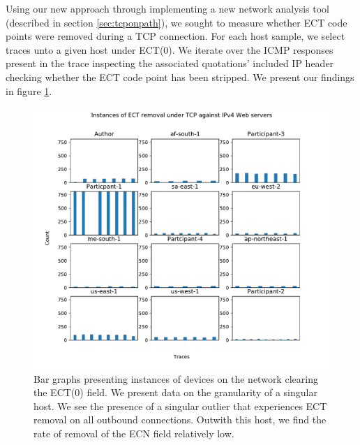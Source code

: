 \documentclass{l4proj}
\begin{document}
Using our new approach through implementing a new network analysis tool (described in section \ref{sec:tcponpath}), we sought to measure whether ECT code points were removed during a TCP connection. For each host sample, we select traces unto a given host under ECT(0). We iterate over the ICMP responses present in the trace inspecting the associated quotations' included IP header checking whether the ECT code point has been stripped. We present our findings in figure \ref{fig:ect_strip}.

\begin{figure}[H]
    \centering
    \includegraphics[scale=0.7]{dissertation/images/tcp_bar.pdf}
    \caption{Bar graphs presenting instances of devices on the network clearing the ECT(0) field. We present data on the granularity of a singular host. We see the presence of a singular outlier that experiences ECT removal on all outbound connections. Outwith this host, we find the rate of removal of the ECN field relatively low.}
    \label{fig:ect_strip}
\end{figure}
\end{document}
